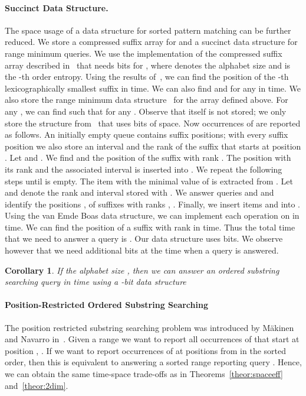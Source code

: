 \documentclass[11pt]{article}
\newtheorem{corollary}{Corollary}
\begin{document}
\paragraph{Succinct Data Structure.}
The space usage of a data structure for sorted pattern matching can be 
further reduced.  We store a compressed suffix array for  and a 
succinct data structure for range minimum queries. 
We use the implementation of the compressed suffix array described in~\cite{GrossiGV03} that needs  bits for , where  denotes  the alphabet size  and  is the -th order entropy.
Using the results of~\cite{GrossiGV03}, we can find the position of the -th lexicographically smallest  suffix in  time.  
We can also find  and  for any  in 
 time. 
We also store the range minimum data structure~\cite{Fis10} for the 
array  defined above.  For any , we can find  such  that 
 for any . Observe that  itself is not stored; we only store the structure from~\cite{Fis10} that uses  bits of space. 
Now occurrences of  are reported as follows. 
An initially empty queue  contains suffix positions;
with every suffix position  we also store an interval  and the rank  of the suffix that starts at 
position . Let  and . We find 
 and  the position  of the suffix with 
rank . The position  with its rank  and the associated interval  is inserted into . We repeat the following steps until  is empty.
The item with the minimal value of  is extracted from 
. Let  and  denote the rank and interval stored with . We answer queries  and 
 and identify the positions ,  of suffixes with ranks , . Finally, we insert items 
 and  into 
. Using the van Emde Boas data structure, we can 
implement each operation on  in  time. 
We can find the position of a suffix with rank  in 
 time. Thus the total time that 
we need to answer a query is . 
Our data structure uses   bits. 
We observe however that we need  additional 
bits at the time when a query is answered. 
\begin{corollary}\label{cor:sortcomp}
If the alphabet size , then 
we can answer an ordered substring searching   query in  time 
using a -bit data structure
\end{corollary}

\paragraph{Position-Restricted Ordered Substring Searching}
The position restricted substring searching problem was introduced by  M{\"a}kinen and Navarro in~\cite{MakinN07}. Given a range  
we want to report all occurrences of  that start at 
position , . 
If we want to report occurrences of  at positions from 
 in the sorted order, then this is equivalent to 
answering a sorted range reporting query . Hence, we can obtain the same 
time-space trade-offs as in Theorems~\ref{theor:spaceeff} and~\ref{theor:2dim}.
\end{document}
